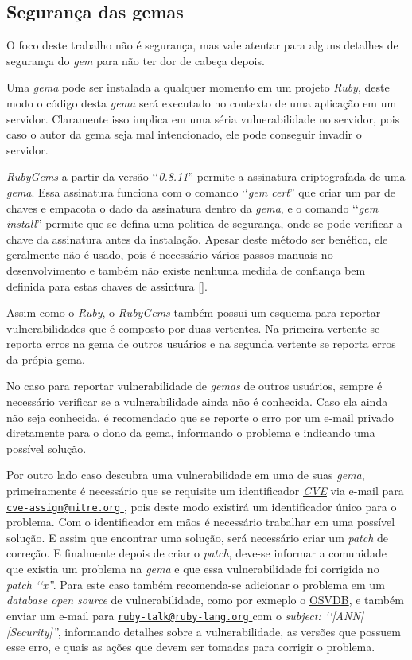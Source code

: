 \subsection{Segurança das gemas}

O foco deste trabalho não é segurança, mas vale atentar para alguns detalhes de segurança do \emph{gem} para
não ter dor de cabeça depois.

Uma \emph{gema} pode ser instalada a qualquer momento em um projeto \emph{Ruby}, deste modo o código desta
\emph{gema} será executado no contexto de uma aplicação em um servidor. Claramente isso implica em uma séria 
vulnerabilidade no servidor, pois caso o autor da gema seja mal intencionado, ele pode conseguir invadir o 
servidor.

\emph{RubyGems} a partir da versão ‘‘\emph{0.8.11}'' permite a assinatura criptografada de uma \emph{gema}. Essa 
assinatura funciona com o comando ‘‘\emph{gem cert}'' que criar um par de chaves e empacota o dado da
assinatura dentro da \emph{gema}, e o comando ‘‘\emph{gem install}'' permite que se defina uma politica de
segurança, onde se pode verificar a chave da assinatura antes da instalação. Apesar deste método 
ser benéfico, ele geralmente não é usado, pois é necessário vários passos manuais no desenvolvimento e 
também não existe nenhuma medida de confiança bem definida para estas chaves de assintura 
[].

Assim como o \emph{Ruby}, o \emph{RubyGems} também possui um esquema para reportar vulnerabilidades que
é composto por duas vertentes. Na primeira vertente se reporta erros na gema de outros usuários e na  
segunda vertente se reporta erros da própia gema.

No caso para reportar vulnerabilidade de \emph{gemas} de outros usuários, sempre é necessário verificar 
se a vulnerabilidade ainda não é conhecida. Caso ela ainda não seja conhecida, é recomendado que se 
reporte o erro por um e-mail privado diretamente para o dono da gema, informando o problema e 
indicando uma possível solução. 

Por outro lado caso descubra uma vulnerabilidade em uma de suas \emph{gema}, primeiramente 
é necessário que se requisite um identificador \emph{\href{https://cve.mitre.org/}{CVE}} via e-mail para 
\href{mailto:cve-assign@mitre.org}{\nolinkurl{cve-assign@mitre.org} }, pois deste modo existirá
um identificador único para o problema. Com o identificador em mãos é necessário trabalhar em uma 
possível solução. E assim que encontrar uma solução, será necessário criar um \emph{patch} de correção. 
E finalmente depois de criar o \emph{patch}, deve-se informar a comunidade que existia um problema na 
\emph{gema} e que essa vulnerabilidade foi corrigida no \emph{patch ‘‘x''}. Para este caso também 
recomenda-se adicionar o problema em um \emph{database open source} de vulnerabilidade, como por exmeplo o 
\href{http://osvdb.org/}{OSVDB}, e também enviar um e-mail para \href{mailto:ruby-talk@ruby-lang.org} 
{\nolinkurl{ruby-talk@ruby-lang.org} } com o \emph{subject: ‘‘[ANN][Security]''}, informando detalhes 
sobre a vulnerabilidade, as versões que possuem esse erro, e quais as ações que devem ser tomadas 
para corrigir o problema. 